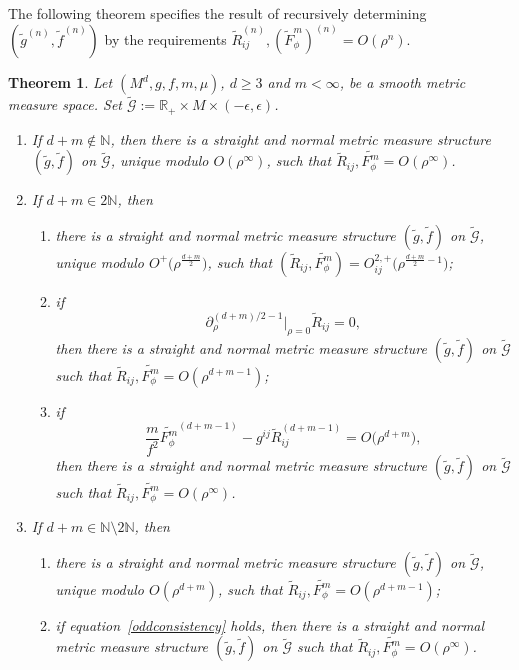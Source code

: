 \documentclass[pdftex]{sigma}
\numberwithin{equation}{section}
\newtheorem{Theorem}{Theorem}[section]
\begin{document}
The following theorem specifies the result of recursively determining $(\widetilde{g}^{(n)},\widetilde{f}^{(n)})$ by the requirements $\widetilde{R}_{ij}^{(n)},(\widetilde{F}_\phi^m)^{(n)}=O(\rho^n)$.
\begin{Theorem}
\label{various-possibilities}
Let $(M^d,g,f,m,\mu)$, $d\geq 3$ and $m<\infty$, be a smooth metric measure space. Set $\widetilde{\mathcal{G}}:=\mathbb{R}_+\times M\times (-\epsilon,\epsilon)$.
\begin{enumerate}[label=$(\roman*)$]\itemsep=0pt
\item If $d+m\notin\mathbb{N}$, then there is a straight and normal metric measure structure $(\widetilde{g},\widetilde{f})$ on $\widetilde{\mathcal{G}}$, unique modulo $O(\rho^\infty)$, such that $\widetilde{R}_{ij},\widetilde{F_\phi^m}=O(\rho^\infty)$.

\item If $d+m\in 2\mathbb{N}$, then
\begin{enumerate}\itemsep=0pt
\item[$(a)$] there is a straight and normal metric measure structure $(\widetilde{g},\widetilde{f})$ on $\widetilde{\mathcal{G}}$, unique modulo $O^+\big(\rho^{\frac{d+m}{2}}\big)$, such that $(\widetilde{R}_{ij},\widetilde{F_\phi^m})=O_{ij}^{2,+}\big(\rho^{\frac{d+m}{2}-1}\big)$;
\item[$(b)$] if
\[
\partial_\rho^{(d+m)/2-1}\big|_{\rho=0}\widetilde{R}_{ij}=0,
\]
then there is a straight and normal metric measure structure $(\widetilde{g},\widetilde{f})$ on $\widetilde{\mathcal{G}}$ such that $\widetilde{R}_{ij},\widetilde{F_\phi^m}=O(\rho^{d+m-1})$;

\item[$(c)$] if
\begin{equation}\label{oddconsistency}
\frac{m}{f^2} \widetilde{F_\phi^m}^{(d+m-1)}-g^{ij}\widetilde{R}_{ij}^{(d+m-1)}=O\big(\rho^{d+m}\big),
\end{equation}
then there is a straight and normal metric measure structure $(\widetilde{g},\widetilde{f})$ on $\widetilde{\mathcal{G}}$ such that $\widetilde{R}_{ij},\widetilde{F_\phi^m}=O(\rho^\infty)$.
\end{enumerate}

\item If $d+m\in \mathbb{N}\setminus 2\mathbb{N}$, then
\begin{enumerate}\itemsep=0pt
\item[$(a)$] there is a straight and normal metric measure structure $(\widetilde{g},\widetilde{f})$ on $\widetilde{\mathcal{G}}$, unique modulo $O(\rho^{d+m})$, such that $\widetilde{R}_{ij},\widetilde{F_\phi^m}=O(\rho^{d+m-1})$;
\item[$(b)$] if equation~\eqref{oddconsistency} holds, then there is a straight and normal metric measure structure $(\widetilde{g},\widetilde{f})$ on $\widetilde{\mathcal{G}}$ such that $\widetilde{R}_{ij},\widetilde{F_\phi^m}=O(\rho^\infty)$.
\end{enumerate}
\end{enumerate}
\end{Theorem}
\end{document}
